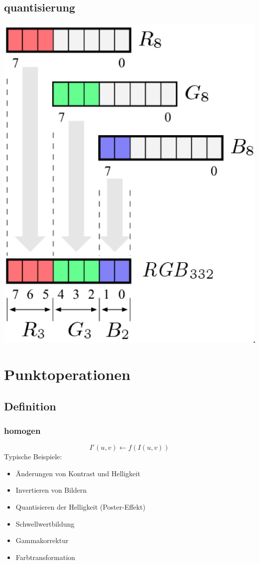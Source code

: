\documentclass[10pt]{article}
\begin{document}
\subsection{quantisierung}
\begin{center}
	\includegraphics[scale=0.3]{quantisierung.png}
\end{center}

\pagebreak
\section{Punktoperationen}

\subsection{Definition}
\subsubsection{homogen}
\begin{equation*}
	I'(u,v) \leftarrow f(I(u,v))
\end{equation*}
Typische Beispiele:
\begin{itemize}
	\item Änderungen von Kontrast und Helligkeit
	\item Invertieren von Bildern
	\item Quantisieren der Helligkeit (Poster-Effekt)
	\item Schwellwertbildung
	\item Gammakorrektur
	\item Farbtransformation
\end{itemize}
\end{document}
